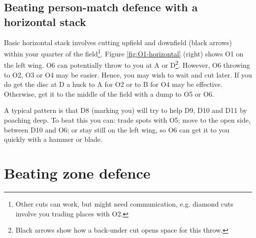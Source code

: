 \documentclass{tufte-handout}
\begin{document}
\subsection{Beating person-match defence with a horizontal stack}\label{sec:horizontall}
Basic horizontal stack 
involves cutting
upfield and downfield (black arrows)
within your quarter of the field\footnote{
Other cuts
can work, 
but might need
communication,
e.g. diamond cuts 
involve you trading places 
with O2.}. 
Figure \ref{fig:O1-horizontal} (right) shows 
O1 on the left wing. 
O6 
can potentially 
throw to you 
at A 
or D\footnote{
Black arrows
show how a back-under cut 
opens space 
for this throw.}. 
However, 
O6 throwing to 
O2, O3 or O4  
may be easier. 
Hence,  
you may wish to 
wait and 
cut later. 
If you do get the disc 
at D 
a huck to 
A for O2 or 
to B for O4 
may be effective.
Otherwise, 
get it to the middle of the field 
with a dump to O5 or O6. 

A typical pattern
is that D8 (marking you)
will try to help 
D9, D10 and D11 
by poaching deep.
To beat this 
you can: 
trade spots with O5;
move to the open side, 
between D10 and O6; or 
stay still 
on the left wing,
so O6 can 
get it to you 
quickly
with a hammer 
or blade.

\section{Beating zone defence}\label{sec:zone}
\end{document}

